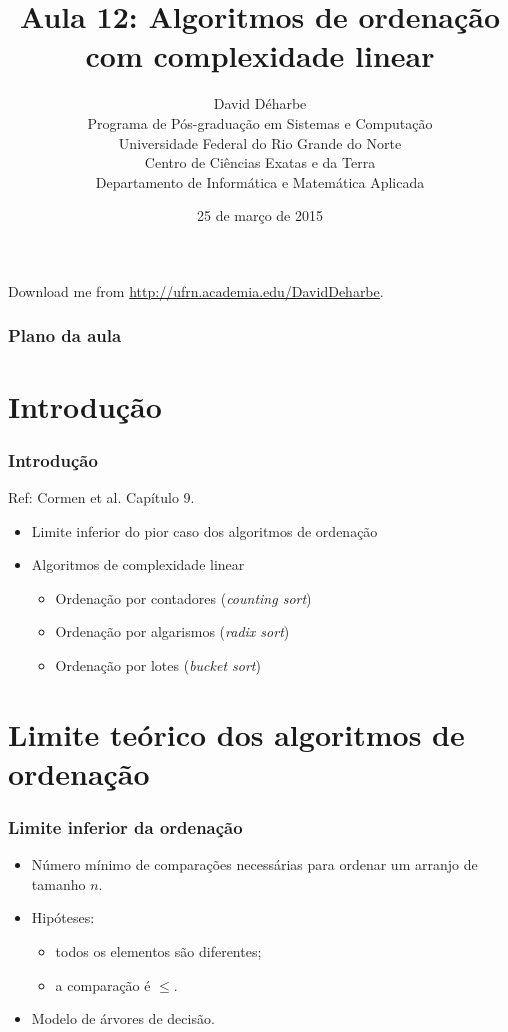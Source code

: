 \documentclass{beamer}
\title{Aula 12: Algoritmos de ordenação com complexidade linear}
\author{David Déharbe \\
  Programa de Pós-graduação em Sistemas e Computação \\
  Universidade Federal do Rio Grande do Norte \\
  Centro de Ciências Exatas e da Terra \\
  Departamento de Informática e Matemática Aplicada}
\date{25 de março de 2015}
\begin{document}
\begin{frame}
  \titlepage
  Download me from \url{http://ufrn.academia.edu/DavidDeharbe}.
\end{frame}

\begin{frame}
  \frametitle{Plano da aula}
  \tableofcontents
\end{frame}

\section{Introdução}

\begin{frame}
  \frametitle{Introdução}

  Ref: Cormen et al. Capítulo 9.

  \begin{itemize}
    \item Limite inferior do pior caso dos algoritmos de ordenação
    \item Algoritmos de complexidade linear
      \begin{itemize}
        \item Ordenação por contadores (\textit{counting sort\/})
        \item Ordenação por algarismos (\textit{radix sort\/})
        \item Ordenação por lotes (\textit{bucket sort\/})
      \end{itemize}
  \end{itemize}

\end{frame}

\section{Limite teórico dos algoritmos de ordenação}

\begin{frame}

  \frametitle{Limite inferior da ordenação}

  \begin{itemize}
    \item Número mínimo de comparações necessárias para ordenar um
      arranjo de tamanho $n$.
    \item Hipóteses:
      \begin{itemize}
        \item todos os elementos são diferentes;
        \item a comparação é $\le$.
      \end{itemize}
    \item Modelo de \alert{árvores de decisão}.
  \end{itemize}

\end{frame}
\end{document}
